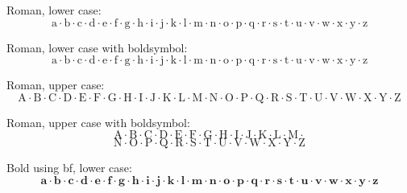 \documentclass[12pt,a4paper]{article}
\theoremstyle{clearprint}
\begin{document}
\noindent 
Roman, lower case:
\begin{equation}
\mathrm{a}\cdot \mathrm{b}\cdot \mathrm{c}\cdot \mathrm{d}\cdot \mathrm{e}\cdot \mathrm{f}\cdot \mathrm{g}\cdot \mathrm{h}\cdot \mathrm{i}\cdot \mathrm{j}\cdot \mathrm{k}\cdot \mathrm{l}\cdot \mathrm{m}\cdot \mathrm{n}\cdot \mathrm{o}\cdot \mathrm{p}\cdot \mathrm{q}\cdot \mathrm{r}\cdot \mathrm{s}\cdot \mathrm{t}\cdot \mathrm{u}\cdot \mathrm{v}\cdot \mathrm{w}\cdot \mathrm{x}\cdot \mathrm{y}\cdot \mathrm{z}
\end{equation}

\noindent 
Roman, lower case with boldsymbol:
\begin{equation}
\boldsymbol{\mathrm{a}\cdot \mathrm{b}\cdot \mathrm{c}\cdot \mathrm{d}\cdot \mathrm{e}\cdot \mathrm{f}\cdot \mathrm{g}\cdot \mathrm{h}\cdot \mathrm{i}\cdot \mathrm{j}\cdot \mathrm{k}\cdot \mathrm{l}\cdot \mathrm{m}\cdot \mathrm{n}\cdot \mathrm{o}\cdot \mathrm{p}\cdot \mathrm{q}\cdot \mathrm{r}\cdot \mathrm{s}\cdot \mathrm{t}\cdot \mathrm{u}\cdot \mathrm{v}\cdot \mathrm{w}\cdot \mathrm{x}\cdot \mathrm{y}\cdot \mathrm{z}}
\end{equation}

\noindent 
Roman, upper case:
\begin{equation}
\mathrm{A}\cdot \mathrm{B}\cdot \mathrm{C}\cdot \mathrm{D}\cdot \mathrm{E}\cdot \mathrm{F}\cdot \mathrm{G}\cdot \mathrm{H}\cdot \mathrm{I}\cdot \mathrm{J}\cdot \mathrm{K}\cdot \mathrm{L}\cdot \mathrm{M}\cdot \mathrm{N}\cdot \mathrm{O}\cdot \mathrm{P}\cdot \mathrm{Q}\cdot \mathrm{R}\cdot \mathrm{S}\cdot \mathrm{T}\cdot \mathrm{U}\cdot \mathrm{V}\cdot \mathrm{W}\cdot \mathrm{X}\cdot \mathrm{Y}\cdot \mathrm{Z}
\end{equation}

\noindent 
Roman, upper case with boldsymbol:
\begin{equation}
\boldsymbol{\mathrm{A}\cdot \mathrm{B}\cdot \mathrm{C}\cdot \mathrm{D}\cdot \mathrm{E}\cdot \mathrm{F}\cdot \mathrm{G}\cdot \mathrm{H}\cdot \mathrm{I}\cdot \mathrm{J}\cdot \mathrm{K}\cdot \mathrm{L}\cdot \mathrm{M}\cdot}
\end{equation}
\begin{equation}
\boldsymbol{ 
\mathrm{N}\cdot \mathrm{O}\cdot \mathrm{P}\cdot \mathrm{Q}\cdot \mathrm{R}\cdot \mathrm{S}\cdot \mathrm{T}\cdot \mathrm{U}\cdot \mathrm{V}\cdot \mathrm{W}\cdot \mathrm{X}\cdot \mathrm{Y}\cdot \mathrm{Z}}
\end{equation}

\noindent 
Bold using bf, lower case:
\begin{equation}
\mathbf{a}\cdot \mathbf{b}\cdot \mathbf{c}\cdot \mathbf{d}\cdot \mathbf{e}\cdot \mathbf{f}\cdot \mathbf{g}\cdot \mathbf{h}\cdot \mathbf{i}\cdot \mathbf{j}\cdot \mathbf{k}\cdot \mathbf{l}\cdot \mathbf{m}\cdot \mathbf{n}\cdot \mathbf{o}\cdot \mathbf{p}\cdot \mathbf{q}\cdot \mathbf{r}\cdot \mathbf{s}\cdot \mathbf{t}\cdot \mathbf{u}\cdot \mathbf{v}\cdot \mathbf{w}\cdot \mathbf{x}\cdot \mathbf{y}\cdot \mathbf{z}
\end{equation}
\end{document}
